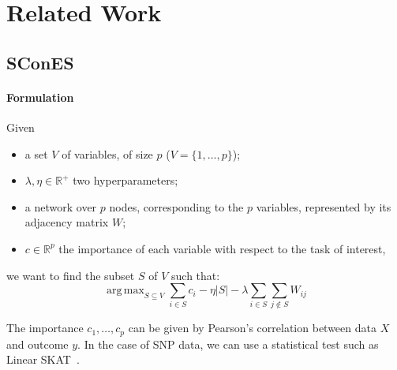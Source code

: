 \documentclass[12pt,a4paper]{article}
\newcommand{\sset}{S}
\newcommand{\vset}{V}
\DeclareMathOperator*{\argmax}{arg\,max}
\begin{document}
\section{Related Work}
\subsection{SConES}

\paragraph{Formulation}
Given
\begin{itemize}
\item a set $\vset$ of variables, of size $p$ ($\vset = \{1, \dots, p\}$);  
\item $\lambda, \eta \in \mathbb{R}^+$ two hyperparameters;
\item a network over $p$ nodes, corresponding to the $p$ variables, represented by its adjacency matrix $W$;
\item $c \in \mathbb{R}^p$ the importance of each variable with respect to the task of interest,
\end{itemize}

we want to find the subset $\sset$ of $\vset$ such that:
\begin{equation}
\argmax_{\sset \subseteq \vset }  \sum_{i \in \sset} c_i - \eta |\sset|
- \lambda \sum_{i \in \sset} \sum_{j \notin \sset} W_{ij} 
\label{eq:scones}
\end{equation}

The importance $c_1, \dots, c_p$ can be given by Pearson's correlation between data $X$ and outcome $y$.
In the case of SNP data, we can use a statistical test such as Linear SKAT~\cite{wu11}.
\end{document}
